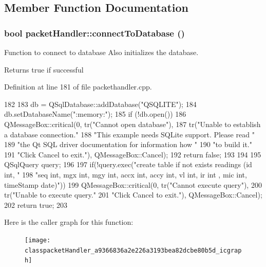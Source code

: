 \subsection{Member Function Documentation}
\hypertarget{classpacketHandler_a9366836a2e226a3193bea82dcbe80b5d}{
\subsubsection[{connectToDatabase}]{\setlength{\rightskip}{0pt plus 5cm}bool packetHandler::connectToDatabase ()}}
\label{classpacketHandler_a9366836a2e226a3193bea82dcbe80b5d}
Function to connect to database Also initializes the database. \begin{DoxyReturn}{Returns}
true if successful 
\end{DoxyReturn}


Definition at line 181 of file packethandler.cpp.




\begin{DoxyCode}
182 {
183         db = QSqlDatabase::addDatabase("QSQLITE");
184         db.setDatabaseName(":memory:");
185         if (!db.open()) {
186             QMessageBox::critical(0, tr("Cannot open database"),
187                 tr("Unable to establish a database connection.\n"
188                          "This example needs SQLite support. Please read "
189                          "the Qt SQL driver documentation for information how "
190                          "to build it.\n\n"
191                          "Click Cancel to exit."), QMessageBox::Cancel);
192             return false;
193         }
194 
195         QSqlQuery query;
196 
197         if(!query.exec("create table if not exists readings (id int, "
198                    "seq int, mgx int, mgy int, accx int, accy int, vl int, ir int
      , mic int, timeStamp date)"))
199             QMessageBox::critical(0, tr("Cannot execute query"),
200                 tr("Unable to execute query.\n"
201                          "Click Cancel to exit."), QMessageBox::Cancel);
202     return true;
203 }
\end{DoxyCode}




Here is the caller graph for this function:\nopagebreak
\begin{figure}[H]
\begin{center}
\leavevmode
\texttt{[image: classpacketHandler\_a9366836a2e226a3193bea82dcbe80b5d\_icgraph]}
\end{center}
\end{figure}


